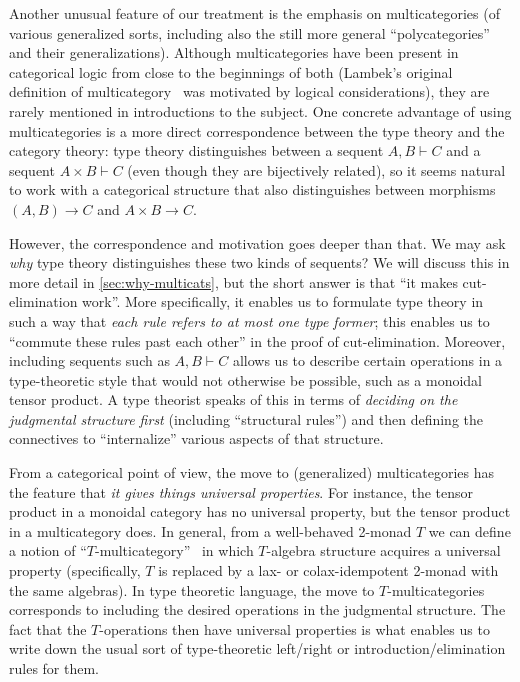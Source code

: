 \documentclass{book}
\let\types\vdash
\begin{document}
Another unusual feature of our treatment is the emphasis on multicategories (of various generalized sorts, including also the still more general ``polycategories'' and their generalizations).
Although multicategories have been present in categorical logic from close to the beginnings of both (Lambek's original definition of multicategory~\cite{lambek:dedsys-ii} was motivated by logical considerations), they are rarely mentioned in introductions to the subject.
One concrete advantage of using multicategories is a more direct correspondence between the type theory and the category theory: type theory distinguishes between a sequent $A,B\types C$ and a sequent $A\times B\types C$ (even though they are bijectively related), so it seems natural to work with a categorical structure that also distinguishes between morphisms $(A,B)\to C$ and $A\times B\to C$.

However, the correspondence and motivation goes deeper than that.
We may ask \emph{why} type theory distinguishes these two kinds of sequents?
We will discuss this in more detail in \cref{sec:why-multicats}, but the short answer is that ``it makes cut-elimination work''.
More specifically, it enables us to formulate type theory in such a way that \emph{each rule refers to at most one type former}; this enables us to ``commute these rules past each other'' in the proof of cut-elimination.
Moreover, including sequents such as $A,B\types C$ allows us to describe certain operations in a type-theoretic style that would not otherwise be possible, such as a monoidal tensor product.
A type theorist speaks of this in terms of \emph{deciding on the judgmental structure first} (including ``structural rules'') and then defining the connectives to ``internalize'' various aspects of that structure.

From a categorical point of view, the move to (generalized) multicategories has the feature that \emph{it gives things universal properties}.
For instance, the tensor product in a monoidal category has no universal property, but the tensor product in a multicategory does.
In general, from a well-behaved 2-monad $T$ we can define a notion of ``$T$-multicategory''~\cite{burroni:t-cats,leinster:higher-opds,hermida:coh-univ,cs:multicats} in which $T$-algebra structure acquires a universal property (specifically, $T$ is replaced by a lax- or colax-idempotent 2-monad with the same algebras).
In type theoretic language, the move to $T$-multicategories corresponds to including the desired operations in the judgmental structure.
The fact that the $T$-operations then have universal properties is what enables us to write down the usual sort of type-theoretic left/right or introduction/elimination rules for them.
\end{document}
